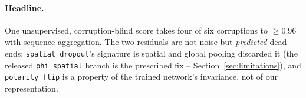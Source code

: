 \paragraph{Headline.}
One unsupervised, corruption-blind score takes four of six corruptions to $\geq 0.96$ with
sequence aggregation. The two residuals are not noise but \emph{predicted} dead ends:
\texttt{spatial\_dropout}'s signature is spatial and global pooling discarded it (the
released \texttt{phi\_spatial} branch is the prescribed fix -- Section~\ref{sec:limitations}),
and \texttt{polarity\_flip} is a property of the trained network's invariance, not of our
representation.
